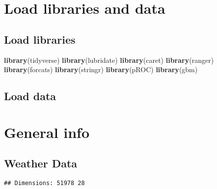 \documentclass[]{article}
\newenvironment{Shaded}{\begin{snugshade}}{\end{snugshade}}
\newcommand{\KeywordTok}[1]{\textcolor[rgb]{0.13,0.29,0.53}{\textbf{#1}}}
\newcommand{\StringTok}[1]{\textcolor[rgb]{0.31,0.60,0.02}{#1}}
\newcommand{\CommentTok}[1]{\textcolor[rgb]{0.56,0.35,0.01}{\textit{#1}}}
\newcommand{\OperatorTok}[1]{\textcolor[rgb]{0.81,0.36,0.00}{\textbf{#1}}}
\newcommand{\NormalTok}[1]{#1}
\begin{document}
\section{Load libraries and data}\label{load-libraries-and-data}

\subsection{Load libraries}\label{load-libraries}

\begin{Shaded}
\begin{Highlighting}[]
\KeywordTok{library}\NormalTok{(tidyverse) }
\KeywordTok{library}\NormalTok{(lubridate)}
\KeywordTok{library}\NormalTok{(caret)}
\KeywordTok{library}\NormalTok{(ranger)}
\KeywordTok{library}\NormalTok{(forcats)}
\KeywordTok{library}\NormalTok{(stringr)}
\KeywordTok{library}\NormalTok{(pROC)}
\KeywordTok{library}\NormalTok{(gbm)}
\end{Highlighting}
\end{Shaded}

\subsection{Load data}\label{load-data}

\begin{Shaded}
\end{Shaded}

\section{General info}\label{general-info}

\subsection{Weather Data}\label{weather-data}

\begin{verbatim}
## Dimensions: 51978 28
\end{verbatim}
\end{document}
